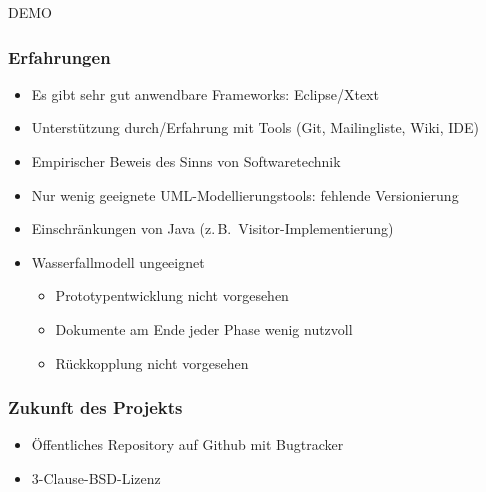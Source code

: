\documentclass[t,svgnames]{beamer}
\begin{document}
\begin{frame}
	\begin{center}
		\vfill
		\Huge{DEMO}
		\vfill		
	\end{center}
\end{frame}

\begin{frame}
    \frametitle{Erfahrungen}
    \begin{itemize}
        \item Es gibt sehr gut anwendbare Frameworks: Eclipse/Xtext
        \item Unterstützung durch/Erfahrung mit Tools (Git, Mailingliste, Wiki, IDE)
        \item Empirischer Beweis des Sinns von Softwaretechnik
    \end{itemize}
    \begin{itemize}
        \item Nur wenig geeignete UML-Modellierungstools: fehlende Versionierung
        \item Einschränkungen von Java (z.\,B.\ Visitor-Implementierung)
        \item Wasserfallmodell ungeeignet
        \begin{itemize}
            \item Prototypentwicklung nicht vorgesehen
            \item Dokumente am Ende jeder Phase wenig nutzvoll
            \item Rückkopplung nicht vorgesehen
        \end{itemize}
    \end{itemize}
\end{frame}

\begin{frame}
    \frametitle{Zukunft des Projekts}
    \begin{itemize}
        \item Öffentliches Repository auf Github mit Bugtracker
        \item 3-Clause-BSD-Lizenz
    \end{itemize}
\end{frame}
\end{document}
